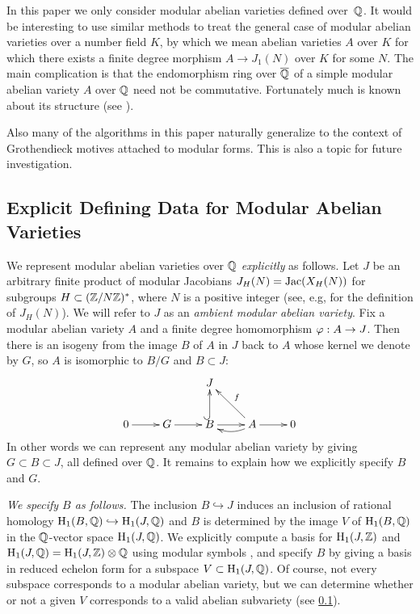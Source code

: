 \documentclass{article}
\begin{document}
\begin{remark}
  In this paper we only consider modular abelian varieties defined
  over~$\mathbb{Q}$.  It would be interesting to use similar methods to treat
  the general case of modular abelian varieties over a number field
  $K$, by which we mean abelian varieties $A$ over $K$ for which there
  exists a finite degree morphism $A\to J_1(N)$ over $K$ for some
  $N$. The main complication is that the endomorphism ring over
  $\overline{\mathbb{Q}}$ of a simple modular abelian variety $A$ over $\mathbb{Q}$ need not
  be commutative.  Fortunately much is known about its structure (see
  \cite{ribet:twistsendoalg}).

  Also many of the algorithms in this paper naturally generalize to
  the context of Grothendieck motives attached to modular forms.  This
  is also a topic for future investigation.
\end{remark}



\subsection{Explicit Defining Data for Modular Abelian Varieties}
We represent modular abelian varieties over $\mathbb{Q}$ {\em explicitly} as
follows. Let $J$ be an arbitrary finite product of modular Jacobians
$J_H(N)=\operatorname{Jac}(X_H(N))$ for subgroups $H\subset (\mathbb{Z}/N\mathbb{Z})^*$, where
$N$ is a positive integer (see, e.g, \cite{} for the definition
of $J_H(N)$).   We will refer to $J$ as an \emph{ambient modular abelian
variety}.
Fix a modular abelian variety $A$ and a
finite degree homomorphism $\varphi: A\to J$.  Then there is an isogeny
from the image $B$ of $A$ in $J$ back to $A$ whose kernel we denote by
$G$, so $A$ is isomorphic to $B/G$ and $B\subset J$:
$$
\xymatrix{
   & & J & & \\
   0\ar[r]& G \ar[r]& B\ar@{^(->}[u] \ar[r]& A\ar[r] \ar@/^/[l]\ar[ul]_{f} & 0
}
$$
In other words we can represent any modular abelian variety by giving
$G\subset B\subset J$, all defined over $\mathbb{Q}$.  It remains to explain
how we explicitly specify $B$ and $G$.

{\em We specify $B$ as follows.}  The inclusion $B \hookrightarrow J$
induces an inclusion of rational homology $\operatorname{H}_1(B, \mathbb{Q}) \hookrightarrow
\operatorname{H}_1(J, \mathbb{Q})$ and $B$ is determined by the image $V$ of $\operatorname{H}_1(B,\mathbb{Q})$ in
the $\mathbb{Q}$-vector space $\operatorname{H}_1(J,\mathbb{Q})$.  We explicitly compute a basis for
$\operatorname{H}_1(J,\mathbb{Z})$ and $\operatorname{H}_1(J,\mathbb{Q})=\operatorname{H}_1(J,\mathbb{Z})\otimes \mathbb{Q}$ using modular
symbols \cite{stein:modform}, and specify $B$ by giving a basis in
reduced echelon form for a subspace $V \subset \operatorname{H}_1(J, \mathbb{Q})$.  Of
course, not every subspace corresponds to a modular abelian variety,
but we can determine whether or not a given $V$ corresponds to a valid
abelian subvariety (see \ref{}).
\end{document}
